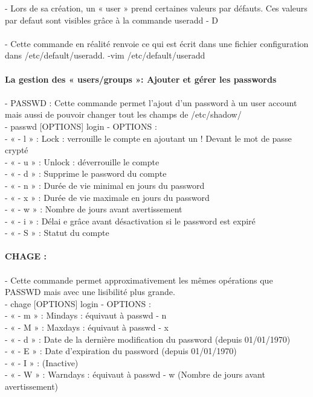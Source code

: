 \documentclass[10pt,a4paper]{article}
\begin{document}
- Lors de sa création, un « user » prend certaines valeurs par défauts. Ces valeurs par defaut sont visibles grâce à la commande useradd - D \\\\
- Cette commande en réalité renvoie ce qui est écrit dans une fichier configuration dans /etc/default/useradd. -vim /etc/default/useradd\\\\
{\large\textbf{La gestion des « users/groups »: Ajouter et gérer les passwords }}\\\\
- PASSWD : Cette commande permet l’ajout d’un password à un user account mais aussi de pouvoir changer tout les champs de /etc/shadow/ \\
-  passwd [OPTIONS] login  - OPTIONS : \\
- « - l » : Lock : verrouille le compte en ajoutant un ! Devant le mot de passe crypté  \\
- « - u » : Unlock : déverrouille le compte  \\
- « - d » : Supprime le password du compte \\
- « - n » : Durée de vie minimal en jours du password \\
- « - x » : Durée de vie maximale en jours du password \\
- « - w » : Nombre de jours avant avertissement \\
- « - i  » : Délai e grâce avant désactivation si le password est expiré \\
- « - S » : Statut du compte \\\\ 
{\large\textbf{CHAGE : }}\\\\
- Cette commande permet approximativement les mêmes opérations que PASSWD mais avec une lisibilité plus grande.  \\
- chage [OPTIONS] login - OPTIONS : \\
- « - m » : Mindays : équivaut à passwd - n \\
- « - M » : Maxdays : équivaut à passwd - x \\
- « - d » : Date de la dernière modification du password (depuis 01/01/1970) \\
- « - E » : Date d’expiration du password (depuis 01/01/1970) \\
- « - I » : (Inactive)\\
- « - W » : Warndays : équivaut à passwd - w (Nombre de jours avant avertissement) \\\\
\end{document}
